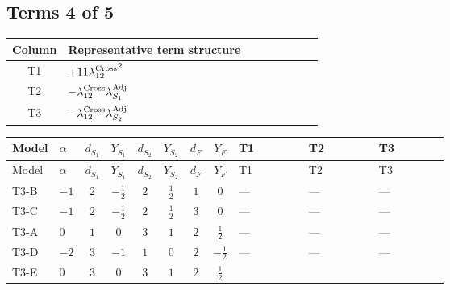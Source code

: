 \documentclass[8pt]{article}
\begin{document}
\begin{landscape}
\subsection*{Terms 4 of 5}
\begin{center}
\begin{tabular}{@{}c >{\raggedright\arraybackslash}p{0.82\linewidth}@{}}
\toprule
Column & Representative term structure \\
\midrule
T1 & \(\displaystyle +11 {\lambda_{12}^{\rm Cross}}^2\) \\
\midrule
T2 & \(\displaystyle -{\lambda_{12}^{\rm Cross}} {\lambda_{S_1}^{\rm Adj}}\) \\
\midrule
T3 & \(\displaystyle -{\lambda_{12}^{\rm Cross}} {\lambda_{S_2}^{\rm Adj}}\) \\
\midrule
\bottomrule
\end{tabular}
\end{center}
\smallskip
\tiny
\begin{longtable}{@{}llcccccc >{\raggedright\arraybackslash}p{0.21\linewidth} >{\raggedright\arraybackslash}p{0.21\linewidth} >{\raggedright\arraybackslash}p{0.21\linewidth}@{}}
\toprule
Model & $\alpha$ & $d_{S_1}$ & $Y_{S_1}$ & $d_{S_2}$ & $Y_{S_2}$ & $d_F$ & $Y_F$ & T1 & T2 & T3 \\
\midrule
\endfirsthead
\toprule
Model & $\alpha$ & $d_{S_1}$ & $Y_{S_1}$ & $d_{S_2}$ & $Y_{S_2}$ & $d_F$ & $Y_F$ & T1 & T2 & T3 \\
\midrule
\endhead
T3-B & $-1$ & $2$ & $-\frac{1}{2}$ & $2$ & $\frac{1}{2}$ & $1$ & $0$ & --- & --- & --- \\
\midrule
T3-C & $-1$ & $2$ & $-\frac{1}{2}$ & $2$ & $\frac{1}{2}$ & $3$ & $0$ & --- & --- & --- \\
\midrule
T3-A & $0$ & $1$ & $0$ & $3$ & $1$ & $2$ & $\frac{1}{2}$ & --- & --- & --- \\
\midrule
T3-D & $-2$ & $3$ & $-1$ & $1$ & $0$ & $2$ & $-\frac{1}{2}$ & --- & --- & --- \\
\midrule
T3-E & $0$ & $3$ & $0$ & $3$ & $1$ & $2$ & $\frac{1}{2}$ & \scriptsize\adjustbox{max width=\linewidth}{$\begin{gathered} +11 {\lambda_{12}^{\rm Cross}}^2\end{gathered}$} & \scriptsize\adjustbox{max width=\linewidth}{$\begin{gathered} -{\lambda_{12}^{\rm Cross}} {\lambda_{S_1}^{\rm Adj}}\end{gathered}$} & \scriptsize\adjustbox{max width=\linewidth}{$\begin{gathered} -{\lambda_{12}^{\rm Cross}} {\lambda_{S_2}^{\rm Adj}}\end{gathered}$} \\
\midrule
\bottomrule
\end{longtable}
\clearpage

\end{landscape}
\end{document}
